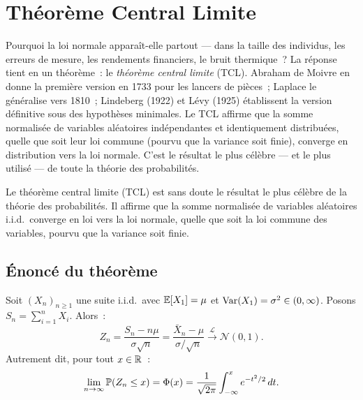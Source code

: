 \chapter{Th\'eor\`eme Central Limite}
\label{ch:tcl}

Pourquoi la loi normale apparaît-elle partout --- dans la taille des individus, les erreurs de mesure, les rendements financiers, le bruit thermique~? La r\'eponse tient en un th\'eor\`eme~: le \emph{th\'eor\`eme central limite} (TCL). Abraham de Moivre en donne la premi\`ere version en 1733 pour les lancers de pi\`eces~; Laplace le g\'en\'eralise vers 1810~; Lindeberg (1922) et L\'evy (1925) \'etablissent la version d\'efinitive sous des hypoth\`eses minimales. Le TCL affirme que la somme normalis\'ee de variables al\'eatoires ind\'ependantes et identiquement distribu\'ees, quelle que soit leur loi commune (pourvu que la variance soit finie), converge en distribution vers la loi normale. C'est le r\'esultat le plus c\'el\`ebre --- et le plus utilis\'e --- de toute la th\'eorie des probabilit\'es.

\begin{intuition}
Le th\'eor\`eme central limite (TCL) est sans doute le r\'esultat le plus c\'el\`ebre
de la th\'eorie des probabilit\'es. Il affirme que la somme normalis\'ee de variables
al\'eatoires i.i.d.\ converge en loi vers la loi normale, quelle que soit la loi
commune des variables, pourvu que la variance soit finie.
\end{intuition}

\section{\'Enonc\'e du th\'eor\`eme}

\begin{theoreme}
\label{thm:tcl}
Soit $(X_n)_{n \geq 1}$ une suite i.i.d.\ avec $\mathbb{E}[X_1] = \mu$ et
$\mathrm{Var}(X_1) = \sigma^2 \in (0, \infty)$. Posons $S_n = \sum_{i=1}^n X_i$.
Alors~:
\[
    Z_n = \frac{S_n - n\mu}{\sigma\sqrt{n}}
    = \frac{\bar{X}_n - \mu}{\sigma/\sqrt{n}}
    \xrightarrow{\mathcal{L}} \mathcal{N}(0, 1).
\]
Autrement dit, pour tout $x \in \mathbb{R}$~:
\[
    \lim_{n \to \infty} \mathbb{P}(Z_n \leq x) = \Phi(x)
    = \frac{1}{\sqrt{2\pi}} \int_{-\infty}^{x} e^{-t^2/2}\, dt.
\]
\end{theoreme}

